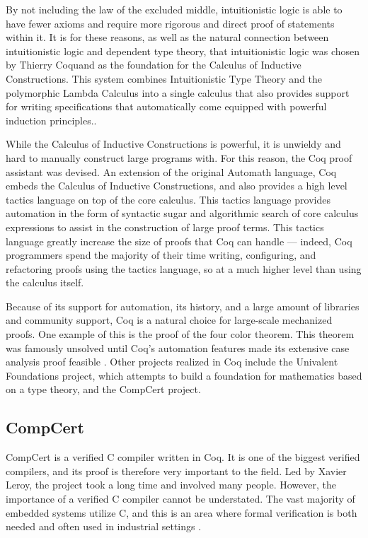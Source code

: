 By not including the law of the excluded middle, intuitionistic logic is able to have fewer axioms and require more rigorous and direct proof of statements within it. It is for these reasons, as well as the natural connection between intuitionistic logic and dependent type theory, that intuitionistic logic was chosen by Thierry Coquand as the foundation for the Calculus of Inductive Constructions. This system combines Intuitionistic Type Theory and the polymorphic Lambda Calculus into a single calculus that also provides support for writing specifications that automatically come equipped with powerful induction principles.. 

While the Calculus of Inductive Constructions is powerful, it is unwieldy and hard to manually construct large programs with. For this reason, the Coq proof assistant \cite{x} was devised. An extension of the original Automath language, Coq embeds the Calculus of Inductive Constructions, and also provides a high level tactics language on top of the core calculus. This tactics language provides automation in the form of syntactic sugar and algorithmic search of core calculus expressions to assist in the construction of large proof terms. This tactics language greatly increase the size of proofs that Coq can handle --- indeed, Coq programmers spend the majority of their time writing, configuring, and refactoring proofs using the tactics language, so at a much higher level than using the calculus itself. 

Because of its support for automation, its history, and a large amount of libraries and community support, Coq is a natural choice for large-scale mechanized proofs. One example of this is the proof of the four color theorem. This theorem was famously unsolved until Coq's automation features made its extensive case analysis proof feasible \cite{x}. Other projects realized in Coq include the Univalent Foundations project, which attempts to build a foundation for mathematics based on a type theory, and the CompCert project.
\subsection{CompCert}
CompCert is a verified C compiler written in Coq. It is one of the biggest verified compilers, and its proof is therefore very important to the field. Led by Xavier Leroy, the project took a long time and involved many people. However, the importance of a verified C compiler cannot be understated. The vast majority of embedded systems utilize C, and this is an area where formal verification is both needed and often used in industrial settings \cite{x}.
